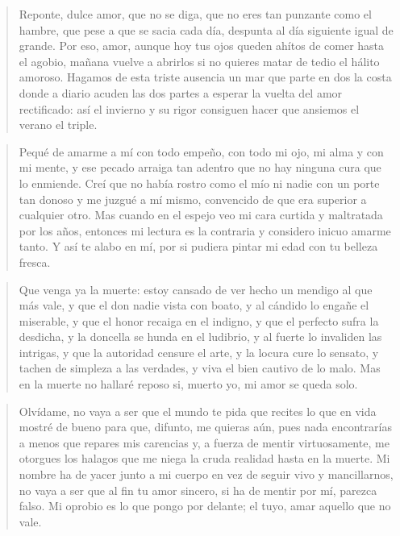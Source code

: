 \documentclass[12pt]{article}
\begin{document}
\clearpage
{}
\begin{verse}
Reponte, dulce amor, que no se diga,  
que no eres tan punzante como el hambre,  
que pese a que se sacia cada día,  
despunta al día siguiente igual de grande.  
Por eso, amor, aunque hoy tus ojos queden  
ahítos de comer hasta el agobio,  
mañana vuelve a abrirlos si no quieres  
matar de tedio el hálito amoroso.  
Hagamos de esta triste ausencia un mar  
que parte en dos la costa donde a diario  
acuden las dos partes a esperar  
la vuelta del amor rectificado:  
así el invierno y su rigor consiguen  
hacer que ansiemos el verano el triple.

\end{verse}

\clearpage
{}
\begin{verse}
Pequé de amarme a mí con todo empeño,  
con todo mi ojo, mi alma y con mi mente,  
y ese pecado arraiga tan adentro  
que no hay ninguna cura que lo enmiende.  
Creí que no había rostro como el mío  
ni nadie con un porte tan donoso  
y me juzgué a mí mismo, convencido  
de que era superior a cualquier otro.  
Mas cuando en el espejo veo mi cara  
curtida y maltratada por los años,  
entonces mi lectura es la contraria  
y considero inicuo amarme tanto.  
Y así te alabo en mí, por si pudiera  
pintar mi edad con tu belleza fresca.

\end{verse}

\clearpage
{}
\begin{verse}
Que venga ya la muerte: estoy cansado  
de ver hecho un mendigo al que más vale,  
y que el don nadie vista con boato,  
y al cándido lo engañe el miserable,  
y que el honor recaiga en el indigno,  
y que el perfecto sufra la desdicha,  
y la doncella se hunda en el ludibrio,  
y al fuerte lo invaliden las intrigas,  
y que la autoridad censure el arte,  
y la locura cure lo sensato,  
y tachen de simpleza a las verdades,  
y viva el bien cautivo de lo malo.  
Mas en la muerte no hallaré reposo  
si, muerto yo, mi amor se queda solo.

\end{verse}

\clearpage
{}
\begin{verse}
Olvídame, no vaya a ser que el mundo  
te pida que recites lo que en vida  
mostré de bueno para que, difunto,  
me quieras aún, pues nada encontrarías  
a menos que repares mis carencias  
y, a fuerza de mentir virtuosamente,  
me otorgues los halagos que me niega  
la cruda realidad hasta en la muerte.  
Mi nombre ha de yacer junto a mi cuerpo  
en vez de seguir vivo y mancillarnos,  
no vaya a ser que al fin tu amor sincero,  
si ha de mentir por mí, parezca falso.  
Mi oprobio es lo que pongo por delante;  
el tuyo, amar aquello que no vale.

\end{verse}
\end{document}

